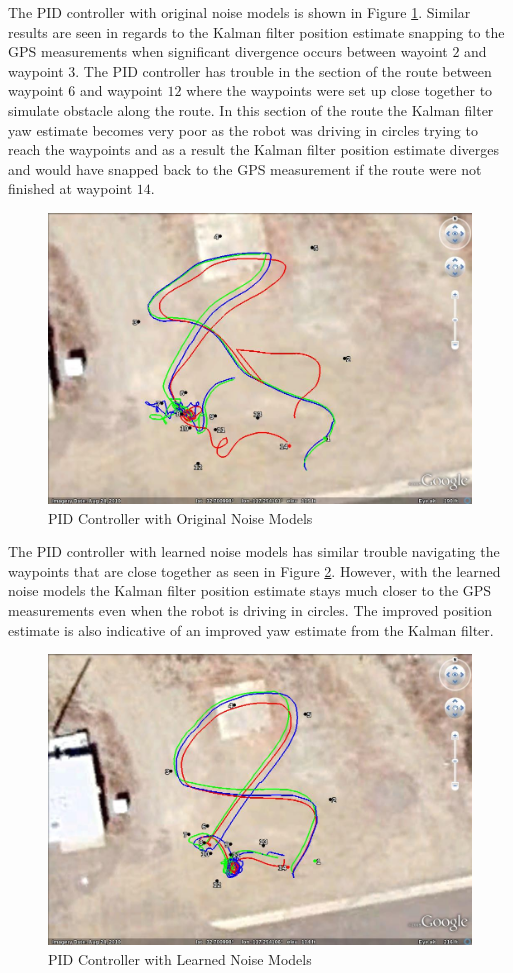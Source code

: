 The PID controller with original noise models is shown in Figure \ref{fig:kfResults3}. Similar results are seen in regards to the Kalman filter position estimate snapping to the GPS measurements when significant divergence occurs between wayoint $2$ and waypoint $3$. The PID controller has trouble in the section of the route between waypoint $6$ and waypoint $12$ where the waypoints were set up close together to simulate obstacle along the route. In this section of the route the Kalman filter yaw estimate becomes very poor as the robot was driving in circles trying to reach the waypoints and as a result the Kalman filter position estimate diverges and would have snapped back to the GPS measurement if the route were not finished at waypoint $14$.

\begin{figure}[ht!]
	\centering
	\includegraphics[width=.75\textwidth]{images/GE/20101203_1755_kf_pidOrigQR}
	\caption{PID Controller with Original Noise Models}
	\label{fig:kfResults3}
\end{figure}

The PID controller with learned noise models has similar trouble navigating the waypoints that are close together as seen in Figure \ref{fig:kfResults4}. However, with the learned noise models the Kalman filter position estimate stays much closer to the GPS measurements even when the robot is driving in circles. The improved position estimate is also indicative of an improved yaw estimate from the Kalman filter.

\begin{figure}[ht!]
	\centering
	\includegraphics[width=.75\textwidth]{images/GE/20101203_1751_kf_pidNewQR}
	\caption{PID Controller with Learned Noise Models}
	\label{fig:kfResults4}
\end{figure}

